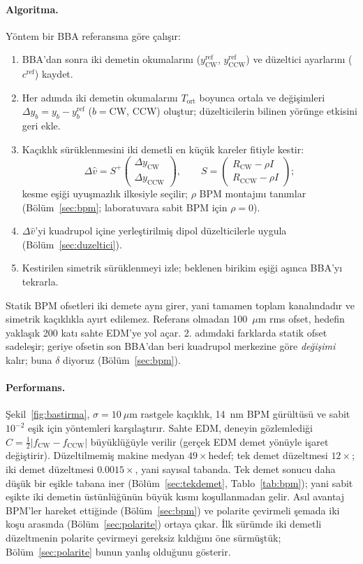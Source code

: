 \documentclass[12pt,a4paper]{extarticle}
\begin{document}
\paragraph{Algoritma.} Yöntem bir BBA referansına göre çalışır:
\begin{enumerate}[nosep]
\item BBA'dan sonra iki demetin okumalarını ($y^\text{ref}_\text{CW}$, $y^\text{ref}_\text{CCW}$) ve düzeltici
ayarlarını ($c^\text{ref}$) kaydet.
\item Her adımda iki demetin okumalarını $T_\text{ort}$ boyunca ortala ve değişimleri
$\Delta y_b=y_b-y^\text{ref}_b$ ($b=$CW, CCW) oluştur; düzelticilerin bilinen yörünge etkisini geri ekle.
\item Kaçıklık sürüklenmesini iki demetli en küçük kareler fitiyle kestir:
\begin{equation}
\Delta\hat v=S^+\begin{pmatrix}\Delta y_\text{CW}\\\Delta y_\text{CCW}\end{pmatrix},\qquad
S=\begin{pmatrix}R_\text{CW}-\rho I\\R_\text{CCW}-\rho I\end{pmatrix};
\label{eq:fit}
\end{equation}
kesme eşiği uyuşmazlık ilkesiyle seçilir; $\rho$ BPM montajını tanımlar (Bölüm~\ref{sec:bpm}; laboratuvara
sabit BPM için $\rho=0$).
\item $\Delta\hat v$'yi kuadrupol içine yerleştirilmiş dipol düzelticilerle uygula (Bölüm~\ref{sec:duzeltici}).
\item Kestirilen simetrik sürüklenmeyi izle; beklenen birikim eşiği aşınca BBA'yı tekrarla.
\end{enumerate}
Statik BPM ofsetleri iki demete aynı girer, yani tamamen toplam kanalındadır ve simetrik kaçıklıkla ayırt
edilemez. Referans olmadan 100~$\mu$m rms ofset, hedefin yaklaşık 200 katı sahte EDM'ye yol açar. 2. adımdaki
farklarda statik ofset sadeleşir; geriye ofsetin son BBA'dan beri kuadrupol merkezine göre \emph{değişimi}
kalır; buna $\delta$ diyoruz (Bölüm~\ref{sec:bpm}).

\paragraph{Performans.} Şekil~\ref{fig:bastirma}, $\sigma=10~\mu$m rastgele kaçıklık, 14~nm BPM gürültüsü ve
sabit $10^{-2}$ eşik için yöntemleri karşılaştırır. Sahte EDM, deneyin gözlemlediği
$C=\tfrac12|f_\text{CW}-f_\text{CCW}|$ büyüklüğüyle verilir (gerçek EDM demet yönüyle işaret değiştirir).
Düzeltilmemiş makine medyan $49\times$hedef; tek demet düzeltmesi $12\times$; iki demet düzeltmesi
$0.0015\times$, yani sayısal tabanda. Tek demet sonucu daha düşük bir eşikle tabana iner
(Bölüm~\ref{sec:tekdemet}, Tablo~\ref{tab:bpm}); yani sabit eşikte iki demetin üstünlüğünün büyük kısmı
koşullanmadan gelir. Asıl avantaj BPM'ler hareket ettiğinde (Bölüm~\ref{sec:bpm}) ve polarite çevirmeli şemada iki koşu arasında
(Bölüm~\ref{sec:polarite}) ortaya çıkar. İlk sürümde iki demetli düzeltmenin polarite çevirmeyi gereksiz
kıldığını öne sürmüştük; Bölüm~\ref{sec:polarite} bunun yanlış olduğunu gösterir.
\end{document}

